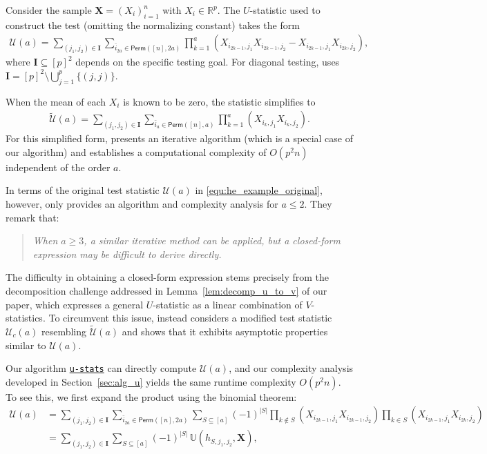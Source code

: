\documentclass[12pt]{article}
\newcommand{\libref}[2]{\href{#2}{\texttt{#1}}}
\def\package{\libref{u-stats}{https://github.com/zrq1706/U-Statistics-Python}}
\theoremstyle{plain}
\theoremstyle{definition}
\def\tilde{\widetilde}
\newcommand{\ustat}{\mathbb{U}}
\newcommand{\perm}[1]{\mathsf{Perm}(#1)}
\def\package{\libref{u-stats}{https://github.com/zrq1706/U-Statistics-Python}}
\begin{document}
\begin{bibunit}[agsm]
Consider the sample $\bm{X} = (X_i)_{i=1}^n$ with $X_i \in \mathbb{R}^p$. The $U$-statistic used to construct the test (omitting the normalizing constant) takes the form
\begin{align}
    \mathcal{U}(a) = \sum_{(j_1,j_2) \in \mathbf{I}} \sum_{\bar{i}_{2a} \in \perm{[n],2a}} \prod_{k=1}^{a} (X_{i_{2k-1},j_1} X_{i_{2k-1},j_2} - X_{i_{2k-1},j_1} X_{i_{2k},j_2}),
    \label{equ:he_example_original}
\end{align}
where $\mathbf{I} \subseteq [p]^2$ depends on the specific testing goal. For diagonal testing, \cite{he2021asymptotically} uses $\mathbf{I} = [p]^2 \setminus \bigcup_{j=1}^p \{(j,j)\}$.

When the mean of each $X_i$ is known to be zero, the statistic simplifies to
\begin{align*}
    \tilde{\mathcal{U}}(a) = \sum_{(j_1,j_2) \in \mathbf{I}} \sum_{\bar{i}_{a} \in \perm{[n],a}} \prod_{k=1}^{a} (X_{i_{k},j_1} X_{i_{k},j_2}).
\end{align*}
For this simplified form, \cite{he2021asymptotically} presents an iterative algorithm (which is a special case of our algorithm) and establishes a computational complexity of $O(p^2 n)$ independent of the order $a$.

In terms of the original test statistic $\mathcal{U} (a)$ in \eqref{equ:he_example_original}, however, \citet{he2021asymptotically} only provides an algorithm and complexity analysis for $a \leq 2$. They remark that:
\begin{quote}
\emph{When $a \geq 3$, a similar iterative method can be applied, but a closed-form expression may be difficult to derive directly.}
\end{quote}

The difficulty in obtaining a closed-form expression stems precisely from the decomposition challenge addressed in Lemma~\ref{lem:decomp_u_to_v} of our paper, which expresses a general $U$-statistic as a linear combination of $V$-statistics. To circumvent this issue, \cite{he2021asymptotically} instead considers a modified test statistic $\mathcal{U}_c(a)$ resembling $\tilde{\mathcal{U}}(a)$ and shows that it exhibits asymptotic properties similar to $\mathcal{U}(a)$.

Our algorithm \package{} can directly compute $\mathcal{U}(a)$, and our complexity analysis developed in Section~\ref{sec:alg_u} yields the same runtime complexity $O(p^2 n)$. To see this, we first expand the product using the binomial theorem:
\begin{align*}
    \mathcal{U}(a) 
    &= \sum_{(j_1,j_2) \in \mathbf{I}} \sum_{\bar{i}_{2a} \in \perm{[n],2a}} \sum_{S \subseteq [a]} (-1)^{|S|} 
       \prod_{k \notin S} (X_{i_{2k-1},j_1} X_{i_{2k-1},j_2}) 
       \prod_{k \in S} (X_{i_{2k-1},j_1} X_{i_{2k},j_2}) \\
    &= \sum_{(j_1,j_2) \in \mathbf{I}} \sum_{S \subseteq [a]} (-1)^{|S|} \, \ustat(h_{S,j_1,j_2}, \bm{X}),
\end{align*}


\end{bibunit}
\end{document}

